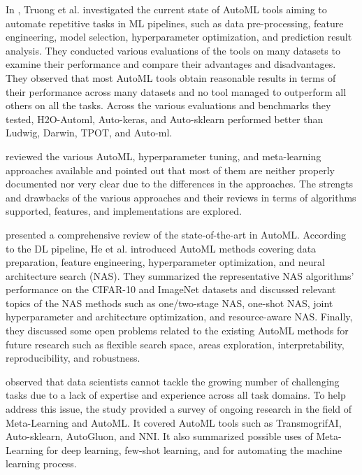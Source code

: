 In \cite{8995391}, Truong et al. investigated the current state of AutoML tools aiming to automate repetitive tasks in ML pipelines, such as data pre-processing, feature engineering, model selection, hyperparameter optimization, and prediction result analysis.
They conducted various evaluations of the tools on many datasets to examine their performance and compare their advantages and disadvantages.
They observed that most AutoML tools obtain reasonable results in terms of their performance across many datasets and no tool managed to outperform all others on all the tasks.
Across the various evaluations and benchmarks they tested, H2O-Automl, Auto-keras, and Auto-sklearn performed better than Ludwig, Darwin, TPOT, and Auto-ml.

\cite{9033810} reviewed the various AutoML, hyperparameter tuning, and meta-learning approaches available and pointed out that most of them are neither properly documented nor very clear due to the differences in the approaches.
The strengts and drawbacks of the various approaches and their reviews in terms of algorithms supported, features, and implementations are explored.

\cite{HE2021106622} presented a comprehensive review of the state-of-the-art in AutoML.
According to the DL pipeline, He et al. introduced AutoML methods covering data preparation, feature engineering, hyperparameter optimization, and neural architecture search (NAS).
They summarized the representative NAS algorithms’ performance on the CIFAR-10 and ImageNet datasets and discussed relevant topics of the NAS methods such as one\slash two-stage NAS, one-shot NAS, joint hyperparameter and architecture optimization, and resource-aware NAS.
Finally, they discussed some open problems related to the existing AutoML methods for future research such as flexible search space, areas exploration, interpretability, reproducibility, and robustness.

\cite{9579526} observed that data scientists cannot tackle the growing number of challenging tasks due to a lack of expertise and experience across all task domains.
To help address this issue, the study provided a survey of ongoing research in the field of Meta-Learning and AutoML.
It covered AutoML tools such as TransmogrifAI, Auto-sklearn, AutoGluon, and NNI.
It also summarized possible uses of Meta-Learning for deep learning, few-shot learning, and for automating the machine learning process.

